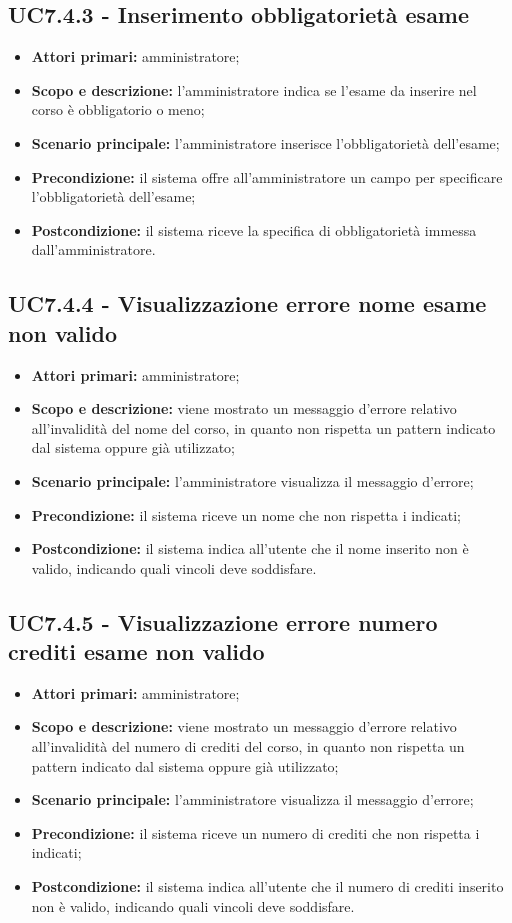 \documentclass[AnalisiDeiRequisiti.tex]{subfiles}
\begin{document}
\subsection{UC7.4.3 - Inserimento obbligatorietà esame}
\begin{itemize}
	\item \textbf{Attori primari:} amministratore;
	\item \textbf{Scopo e descrizione:} l'amministratore indica se l'esame da inserire nel corso è obbligatorio o meno;
	\item \textbf{Scenario principale:} l'amministratore inserisce l'obbligatorietà dell'esame;
	\item \textbf{Precondizione:} il sistema offre all'amministratore un campo per specificare l'obbligatorietà dell'esame; 
	\item \textbf{Postcondizione:} il sistema riceve la specifica di obbligatorietà immessa dall'amministratore.
\end{itemize}
\subsection{UC7.4.4 - Visualizzazione errore nome esame non valido}
\begin{itemize}
	\item \textbf{Attori primari:} amministratore;
	\item \textbf{Scopo e descrizione:} viene mostrato un messaggio d'errore relativo all'invalidità del nome del corso, in quanto non rispetta un pattern indicato dal sistema oppure già utilizzato;
	\item \textbf{Scenario principale:} l'amministratore visualizza il messaggio d'errore;
	\item \textbf{Precondizione:} il sistema riceve un nome che non rispetta i  indicati; 
	\item \textbf{Postcondizione:} il sistema indica all'utente che il nome inserito non è valido, indicando quali vincoli deve soddisfare.
\end{itemize}
\subsection{UC7.4.5 - Visualizzazione errore numero crediti esame non valido}
\begin{itemize}
	\item \textbf{Attori primari:} amministratore;
	\item \textbf{Scopo e descrizione:} viene mostrato un messaggio d'errore relativo all'invalidità del numero di crediti del corso, in quanto non rispetta un pattern indicato dal sistema oppure già utilizzato;
	\item \textbf{Scenario principale:} l'amministratore visualizza il messaggio d'errore;
	\item \textbf{Precondizione:} il sistema riceve un numero di crediti che non rispetta i  indicati; 
	\item \textbf{Postcondizione:} il sistema indica all'utente che il numero di crediti inserito non è valido, indicando quali vincoli deve soddisfare.
\end{itemize}
\end{document}
